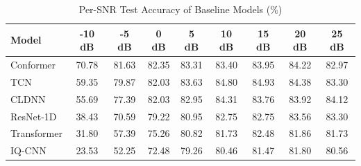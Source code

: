 \begin{table}[!t]
\caption{Per-SNR Test Accuracy of Baseline Models (\%)}
\label{tab:snr_results}
\centering
\footnotesize
\setlength{\tabcolsep}{4pt}
\renewcommand{\arraystretch}{1.12}
\begin{tabular}{lcccccccc}
\hline
\hline
Model & -10 dB & -5 dB & 0 dB & 5 dB & 10 dB & 15 dB & 20 dB & 25 dB \\
\hline
Conformer & 70.78 & 81.63 & 82.35 & 83.31 & 83.40 & 83.95 & 84.22 & 82.97 \\
TCN & 59.35 & 79.87 & 82.03 & 83.63 & 84.80 & 84.93 & 84.38 & 83.30 \\
CLDNN & 55.69 & 77.39 & 82.03 & 82.95 & 84.31 & 83.76 & 83.92 & 84.12 \\
ResNet-1D & 38.43 & 70.59 & 79.22 & 80.95 & 82.75 & 82.75 & 83.56 & 83.30 \\
Transformer & 31.80 & 57.39 & 75.26 & 80.82 & 81.73 & 82.48 & 81.86 & 81.73 \\
IQ-CNN & 23.53 & 52.25 & 72.48 & 79.26 & 80.46 & 81.47 & 81.80 & 80.56 \\
\hline
\hline
\end{tabular}
\end{table}

